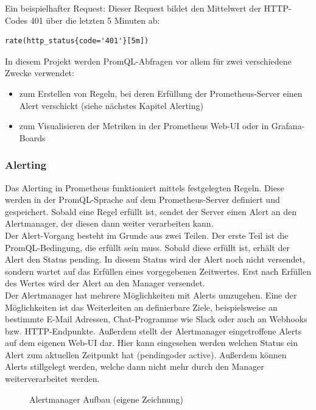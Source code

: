 \documentclass[a4paper,10pt]{scrartcl}
\begin{document}
Ein beispielhafter Request:
Dieser Request bildet den Mittelwert der HTTP-Codes 401 über die letzten 5 Minuten ab:
\begin{lstlisting}
rate(http_status{code='401'}[5m])
\end{lstlisting}

In diesem Projekt werden PromQL-Abfragen vor allem für zwei verschiedene Zwecke verwendet:
\begin{itemize}
\item zum Erstellen von Regeln, bei deren Erfüllung der Prometheus-Server einen Alert verschickt (siehe nächstes Kapitel Alerting)
\item zum Visualisieren der Metriken in der Prometheus Web-UI oder in Grafana-Boards
\end{itemize}

\subsubsection{Alerting}

Das Alerting in Prometheus funktioniert mittels festgelegten Regeln. Diese werden in der PromQL-Sprache auf dem Prometheus-Server definiert und gespeichert. Sobald eine Regel erfüllt ist, sendet der Server einen Alert an den Alertmanager, der diesen dann weiter verarbeiten kann.\\
Der Alert-Vorgang besteht im Grunde aus zwei Teilen. Der erste Teil ist die PromQL-Bedingung, die erfüllt sein muss. Sobald diese erfüllt ist, erhält der Alert den Status \glqq pending\grqq. In diesem Status wird der Alert noch nicht versendet, sondern wartet auf das Erfüllen eines vorgegebenen Zeitwertes. Erst nach Erfüllen des Wertes wird der Alert an den Manager versendet.\\

Der Alertmanager hat mehrere Möglichkeiten mit Alerts umzugehen. Eine der Möglichkeiten ist das Weiterleiten an definierbare Ziele, beispielsweise an bestimmte E-Mail Adressen, Chat-Programme wie Slack oder auch an Webhooks bzw. HTTP-Endpunkte. Außerdem stellt der Alertmanager eingetroffene Alerts auf dem eigenen Web-UI dar. Hier kann eingesehen werden welchen Status ein Alert zum aktuellen Zeitpunkt hat (\glqq pending\grqq oder \glqq active\grqq). Außerdem können Alerts stillgelegt werden, welche dann nicht mehr durch den Manager weiterverarbeitet werden.\\

\begin{figure}[htbp]
  \centering
  \scalebox{.8}{}
  \caption{Alertmanager Aufbau (eigene Zeichnung)}
\end{figure}
\end{document}
